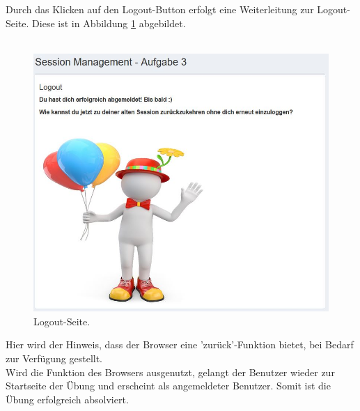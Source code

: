 \noindent Durch das Klicken auf den Logout-Button erfolgt eine Weiterleitung zur Logout-Seite. Diese ist in Abbildung \ref{fig:Aufgabe 3 Abschluss} abgebildet.\\\\
\begin{figure}
	\includegraphics[width=1.0\linewidth]{images/BrokenAuthenticationAndSessionManagement/Logout_Mitte}
	\caption[Logout-Seite.]{Logout-Seite.}
	\label{fig:Aufgabe 3 Abschluss}
\end{figure}

\noindent Hier wird der Hinweis, dass der Browser eine 'zurück'-Funktion bietet, bei Bedarf zur Verfügung gestellt.\\
Wird die Funktion des Browsers ausgenutzt, gelangt der Benutzer wieder zur Startseite der Übung und erscheint als angemeldeter Benutzer. Somit ist die Übung erfolgreich absolviert.\\\\\\\\\\\\\\\\\\\\\\\\\\
